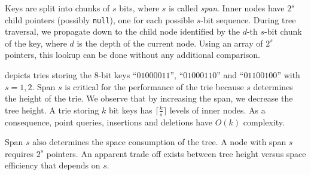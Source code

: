\documentclass[abstracton,12pt]{scrartcl}
\theoremstyle{definition}
\begin{document}
Keys are split into chunks of $s$ bits, where $s$ is called \textit{span}.
Inner nodes have  $2^s$ child pointers (possibly \texttt{null}), 
one for each possible $s$-bit sequence. During tree
traversal, we propagate down to the child node identified by the $d$-th
$s$-bit chunk of the key, where $d$ is the depth of the current node. 
Using an array of $2^s$  pointers, this lookup can be done without any 
additional comparison. 

 depicts tries storing the 
8-bit keys ``$01000011$'', ``$01000110$'' and ``$01100100$'' with 
$s=1,2$. Span $s$ is critical for the performance of the trie because $s$ 
determines the height of the trie. We observe that by increasing the span, 
we decrease the tree height. A trie
storing $k$ bit keys has $\lceil \frac{k}{s} \rceil$ levels of inner nodes.
As a consequence, point queries, insertions and deletions have 
$O(k)$ complexity.

Span $s$ also determines the space consumption of the tree.
A node with span $s$ requires $2^s$ pointers. 
An apparent trade off exists between tree height versus space efficiency that
depends on $s$.
\end{document}
